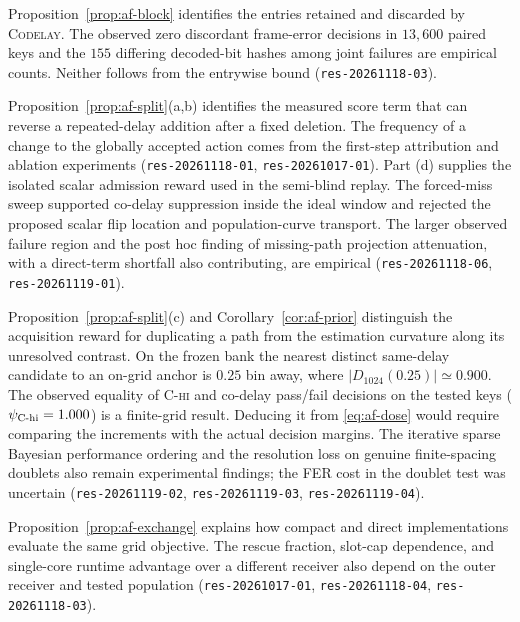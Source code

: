 \begin{afdmremark}
Proposition~\ref{prop:af-block} identifies the entries retained and
discarded by \textsc{Codelay}. The observed zero discordant frame-error
decisions in $13{,}600$ paired keys and the $155$ differing decoded-bit
hashes among joint failures are empirical counts. Neither follows from
the entrywise bound (\texttt{res-20261118-03}).

Proposition~\ref{prop:af-split}(a,b) identifies the measured score
term that can reverse a repeated-delay addition after a fixed
deletion. The frequency of a change to the globally accepted action
comes from the first-step attribution and ablation experiments
(\texttt{res-20261118-01}, \texttt{res-20261017-01}).
Part (d) supplies the isolated scalar admission reward used in
the semi-blind replay. The forced-miss sweep supported co-delay
suppression inside the ideal window and rejected the proposed scalar
flip location and population-curve transport. The larger observed
failure region and the post hoc finding of missing-path projection
attenuation, with a direct-term shortfall also contributing, are
empirical (\texttt{res-20261118-06}, \texttt{res-20261119-01}).

Proposition~\ref{prop:af-split}(c) and Corollary~\ref{cor:af-prior}
distinguish the acquisition reward for duplicating a path from the
estimation curvature along its unresolved contrast. On the frozen
bank the nearest distinct same-delay candidate to an on-grid anchor
is $0.25$ bin away, where $|D_{1024}(0.25)|\simeq0.900$.
The observed equality of \textsc{C-hi} and co-delay pass/fail
decisions on the tested keys ($\psi_{\rm C\text{-}hi}=1.000$) is a
finite-grid result. Deducing it from \eqref{eq:af-dose} would require
comparing the increments with the actual decision margins. The
iterative sparse Bayesian performance ordering and the resolution
loss on genuine finite-spacing doublets also remain experimental
findings; the FER cost in the doublet test was uncertain
(\texttt{res-20261119-02}, \texttt{res-20261119-03},
\texttt{res-20261119-04}).

Proposition~\ref{prop:af-exchange} explains how compact and direct
implementations evaluate the same grid objective. The rescue
fraction, slot-cap dependence, and single-core runtime advantage over
a different receiver also depend on the outer receiver and tested
population (\texttt{res-20261017-01}, \texttt{res-20261118-04},
\texttt{res-20261118-03}).
\end{afdmremark}
